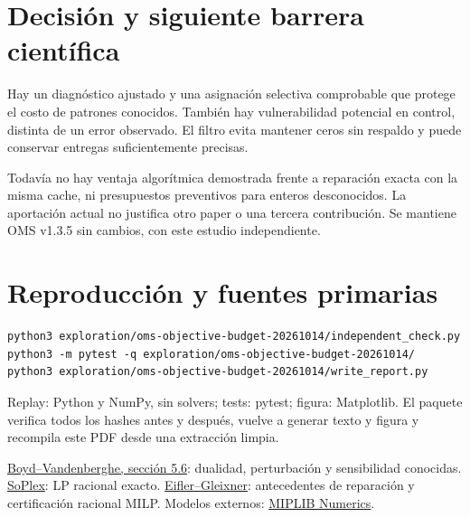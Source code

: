 \documentclass[10pt,a4paper]{article}
\begin{document}
\section*{Decisión y siguiente barrera científica}
Hay un diagnóstico ajustado y una asignación selectiva comprobable que
protege el costo de patrones conocidos. También hay vulnerabilidad potencial
en control, distinta de un error observado. El filtro evita mantener ceros
sin respaldo y puede conservar entregas suficientemente precisas.

Todavía no hay ventaja algorítmica demostrada frente a reparación exacta
con la misma cache, ni presupuestos preventivos para enteros desconocidos.
La aportación actual no justifica otro paper o una tercera contribución.
Se mantiene OMS v1.3.5 sin cambios, con este estudio independiente.
\section*{Reproducción y fuentes primarias}
\begin{verbatim}
python3 exploration/oms-objective-budget-20261014/independent_check.py
python3 -m pytest -q exploration/oms-objective-budget-20261014/
python3 exploration/oms-objective-budget-20261014/write_report.py
\end{verbatim}
Replay: Python y NumPy, sin solvers; tests: pytest; figura: Matplotlib.
El paquete verifica todos los hashes antes y después, vuelve a generar texto
y figura y recompila este PDF desde una extracción limpia.

\href{https://web.stanford.edu/~boyd/cvxbook/bv_cvxbook.pdf}{Boyd--Vandenberghe,
sección 5.6}: dualidad, perturbación y sensibilidad conocidas.
\href{https://soplex.zib.de/doc/html/EXACT.php}{SoPlex}: LP racional exacto.
\href{https://arxiv.org/abs/2101.09141}{Eifler--Gleixner}: antecedentes de
reparación y certificación racional MILP. Modelos externos:
\href{https://miplib.zib.de/tag_numerics.html}{MIPLIB Numerics}.
\end{document}
